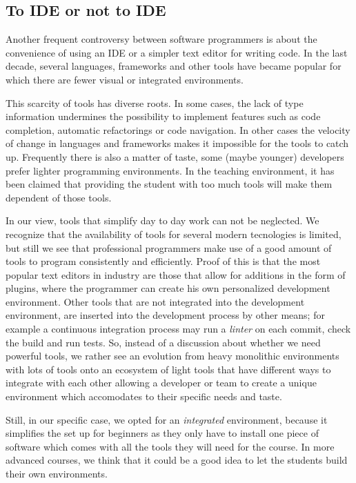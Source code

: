 \subsection{To IDE or not to IDE}
Another frequent controversy between software programmers is about the convenience of using an IDE or a simpler text editor for writing code. In the last decade, several languages, frameworks and other tools have became popular for which there are fewer visual or integrated environments. 

This scarcity of tools has diverse roots. In some cases, the lack of type information undermines the possibility to implement features such as code completion, automatic refactorings or code navigation.
In other cases the velocity of change in languages and frameworks makes it impossible for the tools to catch up.
Frequently there is also a matter of taste, some (maybe younger) developers prefer lighter programming environments.
In the teaching environment, it has been claimed that providing the student with too much tools will make them dependent of those tools.

In our view, tools that simplify day to day work can not be neglected. We recognize that the availability of tools for several modern tecnologies is limited, but still we see that professional programmers make use of a good amount of tools to program consistently and efficiently.
Proof of this is that the most popular text editors in industry are those that allow for additions in the form of plugins, where the programmer can create his own personalized development environment.
Other tools that are not integrated into the development environment, are inserted into the development process by other means; for example a continuous integration process may run a \emph{linter} on each commit, check the build and run tests.
So, instead of a discussion about whether we need powerful tools, we rather see an evolution from heavy monolithic environments with lots of tools onto an ecosystem of light tools that have different ways to integrate with each other allowing a developer or team to create a unique environment which accomodates to their specific needs and taste. 

Still, in our specific case, we opted for an \emph{integrated} environment, because it simplifies the set up for beginners as they only have to install one piece of software which comes with all the tools they will need for the course. In more advanced courses, we think that it could be a good idea to let the students build their own environments.

